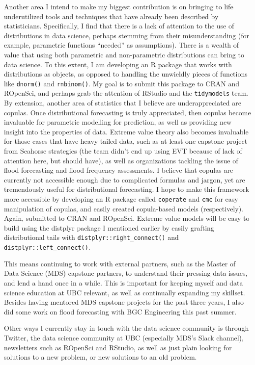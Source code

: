 \documentclass[]{book}
\begin{document}
Another area I intend to make my biggest contribution is on bringing to life underutilized tools and techniques that have already been described by statisticians. Specifically, I find that there is a lack of attention to the use of distributions in data science, perhaps stemming from their misunderstanding (for example, parametric functions ``needed'' as assumptions). There is a wealth of value that using both parametric and non-parametric distributions can bring to data science. To this extent, I am developing an R package that works with distributions as objects, as opposed to handling the unwieldly pieces of functions like \texttt{dnorm()} and \texttt{rnbinom()}. My goal is to submit this package to CRAN and ROpenSci, and perhaps grab the attention of RStudio and the \texttt{tidymodels} team. By extension, another area of statistics that I believe are underappreciated are copulas. Once distributional forecasting is truly appreciated, then copulas become invaluable for parametric modelling for prediction, as well as providing new insight into the properties of data. Extreme value theory also becomes invaluable for those cases that have heavy tailed data, such as at least one capstone project from Seahorse strategies (the team didn't end up using EVT because of lack of attention here, but should have), as well as organizations tackling the issue of flood forecasting and flood frequency assessments. I believe that copulas are currently not accessible enough due to complicated formulas and jargon, yet are tremendously useful for distributional forecasting. I hope to make this framework more accessible by developing an R package called \texttt{coperate} and \texttt{cmc} for easy manipulation of copulas, and easily created copula-based models (respectively). Again, submitted to CRAN and ROpenSci. Extreme value models will be easy to build using the distplyr package I mentioned earlier by easily grafting distributional tails with \texttt{distplyr::right\_connect()} and \texttt{distplyr::left\_connect()}.

This means continuing to work with external partners, such as the Master of Data Science (MDS) capstone partners, to understand their pressing data issues, and lend a hand once in a while. This is important for keeping myself and data science education at UBC relevant, as well as continually expanding my skillset. Besides having mentored MDS capstone projects for the past three years, I also did some work on flood forecasting with BGC Engineering this past summer.

Other ways I currently stay in touch with the data science community is through Twitter, the data science community at UBC (especially MDS's Slack channel), newsletters such as ROpenSci and RStudio, as well as just plain looking for solutions to a new problem, or new solutions to an old problem.
\end{document}
